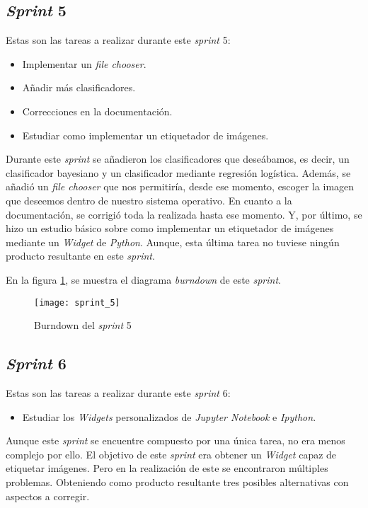 \subsection{\textit{Sprint} 5}
Estas son las tareas a realizar durante este \textit{sprint} 5:

\begin{itemize}
	\item Implementar un \textit{file chooser}. 
	\item Añadir más clasificadores.
	\item Correcciones en la documentación.
	\item Estudiar como implementar un etiquetador de imágenes.
\end{itemize}

Durante este \textit{sprint} se añadieron los clasificadores que deseábamos, es decir, un clasificador bayesiano y un clasificador mediante regresión logística. Además, se añadió un \textit{file chooser} que nos permitiría, desde ese momento, escoger la imagen que deseemos dentro de nuestro sistema operativo. En cuanto a la documentación, se corrigió toda la  realizada hasta ese momento. Y, por último, se hizo un estudio básico sobre como implementar un etiquetador de imágenes mediante un \textit{Widget} de \textit{Python}. Aunque, esta última tarea no tuviese ningún producto resultante en este \textit{sprint}.

En la figura \ref{fig:A.1.6}, se muestra el diagrama \textit{burndown} de este \textit{sprint}.

\begin{figure}
\centering
\texttt{[image: sprint\_5]}
\caption{Burndown del \textit{sprint} 5}
\label{fig:A.1.6}
\end{figure}

\subsection{\textit{Sprint} 6}
Estas son las tareas a realizar durante este \textit{sprint} 6:

\begin{itemize}
	\item Estudiar los \textit{Widgets} personalizados de \textit{Jupyter Notebook} e \textit{Ipython}.
\end{itemize}

Aunque este \textit{sprint} se encuentre compuesto por una única tarea, no era menos complejo por ello. El objetivo de este \textit{sprint} era obtener un \textit{Widget} capaz de etiquetar imágenes. Pero en la realización de este se encontraron múltiples problemas. Obteniendo como producto resultante tres posibles alternativas con aspectos a corregir.

